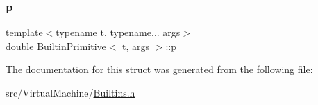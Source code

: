 \mbox{\label{struct_builtin_primitive_a1a8d8e62426c9454355412b80faf684c}} 
\subsubsection{\texorpdfstring{p}{p}}
{\footnotesize\ttfamily template$<$typename t, typename... args$>$ \\
double \hyperlink{struct_builtin_primitive}{Builtin\+Primitive}$<$ t, args $>$\+::p}



The documentation for this struct was generated from the following file\+:\begin{DoxyCompactItemize}
\item 
src/\+Virtual\+Machine/\hyperlink{_builtins_8h}{Builtins.\+h}\end{DoxyCompactItemize}

